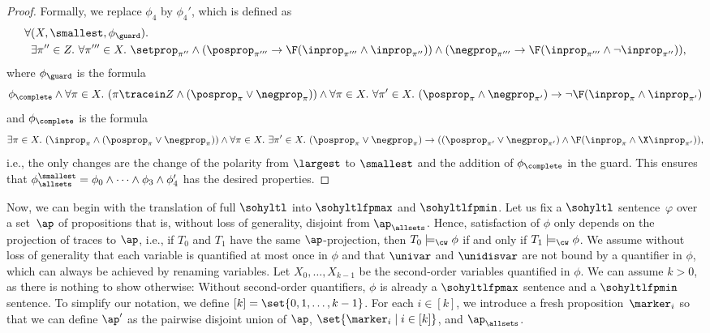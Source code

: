 \begin{proof}
Formally, we replace $\phi_4$ by $\phi_4'$, which is defined as 
\begin{align*}
\forall {}&{}(X, \smallest, \phi_\guard) .\\
&{}\exists \pi'' \in Z.\ \forall \pi''' \in X.\ \setprop_{\pi''} \wedge  {(\posprop_{\pi'''} \rightarrow \F(\inprop_{\pi'''} \wedge \inprop_{\pi''}))}
\wedge 
{(\negprop_{\pi'''} \rightarrow \F(\inprop_{\pi'''} \wedge \neg\inprop_{\pi''}))},
\end{align*} 
where $\phi_\guard$ is the formula
\[
 \phi_\complete  \wedge \forall \pi \in X.\ (\pi\tracein Z \wedge (\posprop_\pi \vee \negprop_\pi)) \wedge \forall \pi \in X.\ \forall \pi' \in X.\ (\posprop_\pi \wedge \negprop_{\pi'}) \rightarrow \neg \F(\inprop_{\pi} \wedge \inprop_{\pi'})
\]
and $\phi_\complete$ is the formula
\[
\exists \pi \in X.\ (\inprop_\pi \wedge (\posprop_\pi \vee \negprop_\pi)) \wedge \forall \pi \in X.\ \exists \pi' \in X.\ (\posprop_\pi \vee \negprop_\pi) \rightarrow ((\posprop_{\pi'} \vee \negprop_{\pi'}) \wedge \F( \inprop_\pi \wedge \X\inprop_{\pi'})),
\]
i.e., the only changes are the change of the polarity from $\largest$ to $\smallest$ and the addition of $\phi_\complete$ in the guard.
This ensures that $\phi_\allsets^\smallest = \phi_0 \wedge \cdots \wedge \phi_3 \wedge \phi_4'$ has the desired properties.
\end{proof}

Now, we can begin with the translation of full $\sohyltl$ into $\sohyltlfpmax$ and $\sohyltlfpmin$.
Let us fix a $\sohyltl$ sentence~$\varphi$ over a set~$\ap$ of propositions that is, without loss of generality, disjoint from $\ap_\allsets$.
Hence, satisfaction of $\phi$ only depends on the projection of traces to $\ap$, i.e., if $T_0$ and $T_1$ have the same $\ap$-projection, then $T_0 \models_\cw \phi$ if and only if $T_1 \models_\cw\phi$. 
We assume without loss of generality that each variable is quantified at most once in $\phi$ and that $\univar$ and $\unidisvar$ are not bound by a quantifier in $\phi$, which can always be achieved by renaming variables. 
Let $X_0, \ldots, X_{k-1}$ be the second-order variables quantified in $\phi$. 
We can assume $k>0$, as there is nothing to show otherwise: Without second-order quantifiers, $\phi$ is already a $\sohyltlfpmax$ sentence and a $\sohyltlfpmin$ sentence.
To simplify our notation, we define $[k] = \set{0,1,\ldots, k-1}$.
For each $i \in [k]$, we introduce a fresh proposition~$\marker_{i}$ so that we can define $\ap'$ as the pairwise disjoint union of $\ap$, $\set{\marker_{i} \mid i \in [k]}$, and $\ap_\allsets$.

